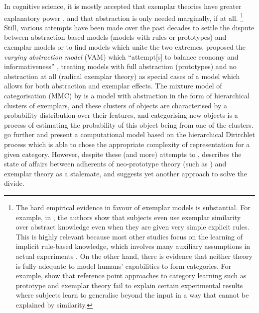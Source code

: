 In cognitive science, it is mostly accepted that exemplar theories have greater explanatory power \citep[184]{Vanpaemel2016}, and that abstraction is only needed marginally, if at all.%
\footnote{The hard empirical evidence in favour of exemplar models is substantial.
  For example, in \cite{HahnEa2010}, the authors show that subjects even use exemplar similarity over abstract knowledge even when they are given very simple explicit rules.
  This is highly relevant because most other studies focus on the learning of implicit rule-based knowledge, which involves many auxiliary assumptions in actual experiments \citep[2]{HahnEa2010}.
On the other hand, there is evidence that neither theory is fully adequate to model humans' capabilities to form categories.
For example, \cite{ConawayKurtz2016} show that reference point approaches to category learning such as prototype and exemplar theory fail to explain certain experimental results where subjects learn to generalise beyond the input in a way that cannot be explained by similarity.
}
Still, various attempts have been made over the past decades to settle the dispute between abstraction-based models (models with rules or prototypes) and exemplar models or to find models which unite the two extremes.
\cite{VanpaemelStorms2008,LeeVanpaemel2008} proposed the \textit{varying abstraction model} (VAM) which ``attempt[s] to balance economy and informativeness'' \citep[745]{LeeVanpaemel2008}, treating models with full abstraction (prototypes) and no abstraction at all (radical exemplar theory) as special cases of a model which allows for both abstraction and exemplar effects.
The mixture model of categorisation (MMC) by \cite{Rosseel2002} is a model with abstraction in the form of hierarchical clusters of exemplars, and these clusters of objects are characterised by a probability distribution over their features, and categorising new objects is a process of estimating the probability of this object being from one of the clusters.
\cite{GriffithsEa2009} go further and present a computational model based on the hierarchical Dirirchlet process which is able to chose the appropriate complexity of representation for a given category.
However, despite these (and more) attempts to , \cite[183--184]{Vanpaemel2016} describes the state of affairs between adherents of neo-prototype theory (such as \citealp{MindaSmith2001,MindaSmith2002}) and exemplar theory as a stalemate, and suggests yet another approach to solve the divide.


